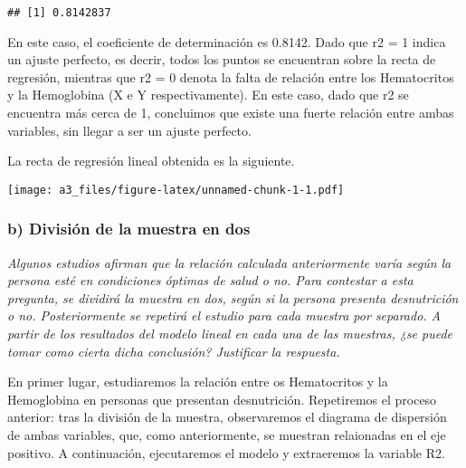 \documentclass[]{article}
\newenvironment{Shaded}{\begin{snugshade}}{\end{snugshade}}
\newcommand{\DataTypeTok}[1]{\textcolor[rgb]{0.13,0.29,0.53}{#1}}
\newcommand{\KeywordTok}[1]{\textcolor[rgb]{0.13,0.29,0.53}{\textbf{#1}}}
\newcommand{\NormalTok}[1]{#1}
\newcommand{\OperatorTok}[1]{\textcolor[rgb]{0.81,0.36,0.00}{\textbf{#1}}}
\newcommand{\StringTok}[1]{\textcolor[rgb]{0.31,0.60,0.02}{#1}}
\begin{document}
\begin{Shaded}
\end{Shaded}

\begin{verbatim}
## [1] 0.8142837
\end{verbatim}

En este caso, el coeficiente de determinación es 0.8142. Dado que r2 = 1
indica un ajuste perfecto, es decrir, todos los puntos se encuentran
sobre la recta de regresión, mientras que r2 = 0 denota la falta de
relación entre los Hematocritos y la Hemoglobina (X e Y
respectivamente). En este caso, dado que r2 se encuentra más cerca de 1,
concluimos que existe una fuerte relación entre ambas variables, sin
llegar a ser un ajuste perfecto.

La recta de regresión lineal obtenida es la siguiente.

\begin{Shaded}
\end{Shaded}

\texttt{[image: a3\_files/figure-latex/unnamed-chunk-1-1.pdf]}

\hypertarget{b-divisiuxf3n-de-la-muestra-en-dos}{%
\subsubsection{b) División de la muestra en
dos}\label{b-divisiuxf3n-de-la-muestra-en-dos}}

\emph{Algunos estudios afirman que la relación calculada anteriormente
varía según la persona esté en condiciones óptimas de salud o no. Para
contestar a esta pregunta, se dividirá la muestra en dos, según si la
persona presenta desnutrición o no. Posteriormente se repetirá el
estudio para cada muestra por separado. A partir de los resultados del
modelo lineal en cada una de las muestras, ¿se puede tomar como cierta
dicha conclusión? Justificar la respuesta.}

En primer lugar, estudiaremos la relación entre os Hematocritos y la
Hemoglobina en personas que presentan desnutrición. Repetiremos el
proceso anterior: tras la división de la muestra, observaremos el
diagrama de dispersión de ambas variables, que, como anteriormente, se
muestran relaionadas en el eje positivo. A continuación, ejecutaremos el
modelo y extraeremos la variable R2.
\end{document}
